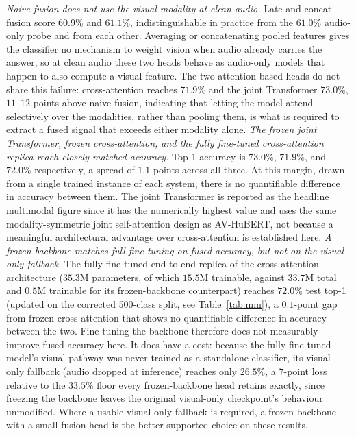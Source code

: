 \documentclass[10pt, a4paper]{article}
\begin{document}
\noindent\emph{Naive fusion does not use the visual modality at clean audio.} Late and concat fusion score $60.9\%$ and $61.1\%$, indistinguishable in practice from the $61.0\%$ audio-only probe and from each other. Averaging or concatenating pooled features gives the classifier no mechanism to weight vision when audio already carries the answer, so at clean audio these two heads behave as audio-only models that happen to also compute a visual feature. The two attention-based heads do not share this failure: cross-attention reaches $71.9\%$ and the joint Transformer $73.0\%$, $11$--$12$ points above naive fusion, indicating that letting the model attend selectively over the modalities, rather than pooling them, is what is required to extract a fused signal that exceeds either modality alone.
\noindent\emph{The frozen joint Transformer, frozen cross-attention, and the fully fine-tuned cross-attention replica reach closely matched accuracy.} Top-1 accuracy is $73.0\%$, $71.9\%$, and $72.0\%$ respectively, a spread of $1.1$ points across all three. At this margin, drawn from a single trained instance of each system, there is no quantifiable difference in accuracy between them. The joint Transformer is reported as the headline multimodal figure since it has the numerically highest value and uses the same modality-symmetric joint self-attention design as AV-HuBERT, not because a meaningful architectural advantage over cross-attention is established here.
\noindent\emph{A frozen backbone matches full fine-tuning on fused accuracy, but not on the visual-only fallback.} The fully fine-tuned end-to-end replica of the cross-attention architecture ($35.3$M parameters, of which $15.5$M trainable, against $33.7$M total and $0.5$M trainable for its frozen-backbone counterpart) reaches $72.0\%$ test top-1 (updated on the corrected 500-class split, see Table~\ref{tab:mm}), a $0.1$-point gap from frozen cross-attention that shows no quantifiable difference in accuracy between the two. Fine-tuning the backbone therefore does not measurably improve fused accuracy here. It does have a cost: because the fully fine-tuned model's visual pathway was never trained as a standalone classifier, its visual-only fallback (audio dropped at inference) reaches only $26.5\%$, a $7$-point loss relative to the $33.5\%$ floor every frozen-backbone head retains exactly, since freezing the backbone leaves the original visual-only checkpoint's behaviour unmodified. Where a usable visual-only fallback is required, a frozen backbone with a small fusion head is the better-supported choice on these results.
\end{document}

